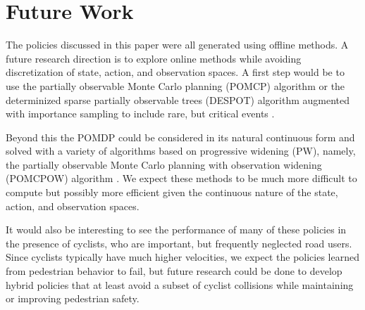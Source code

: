\documentclass[conference]{IEEEtran}
\begin{document}
\section{Future Work}
\label{sec:future-work}

The policies discussed in this paper were all generated using offline methods. A future research direction is to explore online methods while avoiding discretization of state, action, and observation spaces. A first step would be to use the partially observable Monte Carlo planning (POMCP) algorithm \cite{Silver2010Monte-CarloPOMDPs} or the determinized sparse partially observable trees (DESPOT) algorithm augmented with importance sampling to include rare, but critical events \cite{Ye2017DESPOT:Regularization, Luo2019ImportanceUncertainty}. 

Beyond this the POMDP could be considered in its natural continuous form and solved with a variety of algorithms based on progressive widening (PW), namely, the partially observable Monte Carlo planning with observation widening (POMCPOW) algorithm \cite{Sunberg2018OnlineSpaces}. We expect these methods to be much more difficult to compute but possibly more efficient given the continuous nature of the state, action, and observation spaces.

It would also be interesting to see the performance of many of these policies in the presence of cyclists, who are important, but frequently neglected road users. Since cyclists typically have much higher velocities, we expect the policies learned from pedestrian behavior to fail, but future research could be done to develop hybrid policies that at least avoid a subset of cyclist collisions while maintaining or improving pedestrian safety.



\end{document}
